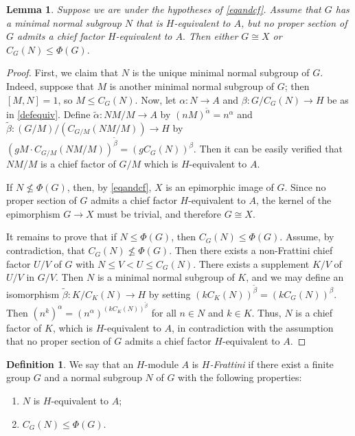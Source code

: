 \documentclass[a4paper,10pt]{amsart}
\theoremstyle{plain}
\newtheorem{lemma}[thm]{Lemma}
\theoremstyle{definition}
\newtheorem{definition}[thm]{Definition}
\begin{document}
\begin{lemma}\label{preparo} Suppose we are under the hypotheses of \cref{eqandcf}. Assume that $G$ has a minimal normal subgroup $N$ that is $H$-equivalent to $A$, but no proper section of $G$ admits a chief factor $H$-equivalent to $A.$
Then either $G\cong X$ or $C_G(N)\leq \Phi(G).$
\end{lemma}
\begin{proof}
	First, we claim that $N$ is the unique minimal normal subgroup of $G$. Indeed, suppose that $M$ is another minimal normal subgroup of $G$; then $[M,N]=1$, so $M \leq C_G(N)$. Now, let $\alpha\colon N \to A$ and $\beta: G/C_G(N) \to H$ be as in \cref{defequiv}. Define $\tilde{\alpha}\colon NM/M \to A$ by $(nM)^{\tilde{\alpha}} = n^\alpha$ and $\tilde{\beta}\colon (G/M)/(C_{G/M}(NM/M)) \to H$ by $(gM\cdot C_{G/M}(NM/M))^{\tilde{\beta}} = (gC_G(N))^\beta$. Then it can be easily verified that $NM/M$ is a chief factor of $G/M$ which is $H$-equivalent to $A$.
	
If $N \not\leq \Phi(G)$, then, by \cref{eqandcf}, $X$ is an epimorphic image of $G$. Since no proper section of $G$ admits a chief factor $H$-equivalent to $A$, the kernel of the epimorphism $G \to X$ must be trivial, and therefore $G \cong X$.


It remains to prove that if $N \leq \Phi(G)$, then $C_G(N) \leq \Phi(G)$.
Assume, by contradiction, that $C_G(N) \not\leq \Phi(G)$. Then there exists a non-Frattini chief factor $U/V$ of $G$ with $N \leq V < U \leq C_G(N)$. There exists a supplement $K/V$ of $U/V$ in $G/V$. Then $N$ is a minimal normal subgroup of $K$, and we may define an isomorphism $\tilde{\beta}\colon  K/C_K(N) \to H$ by setting $(kC_K(N))^{\tilde{\beta}} = (kC_G(N))^\beta$. Then $(n^k)^\alpha = (n^\alpha)^{(kC_K(N))^{\tilde{\beta}}}$ for all $n \in N$ and $k \in K$. Thus, $N$ is a chief factor of $K$, which is $H$-equivalent to $A$, in contradiction with the assumption that no proper section of $G$ admits a chief factor $H$-equivalent to $A$.
\end{proof}


\begin{definition}\label{frath}We say that an $H$-module $A$ is \emph{$H$-Frattini} if there exist a finite group $G$ and a normal subgroup $N$ of $G$ with the following properties:
\begin{enumerate}
\item $N$ is $H$-equivalent to $A$;
\item $C_G(N)\leq \Phi(G).$
\end{enumerate}
\end{definition}
\end{document}
